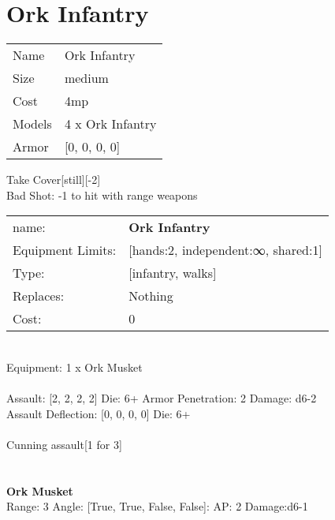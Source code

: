 \pagebreak\pagebreak

\section{ Ork Infantry }

\begin{tabular}{ll}
  Name & Ork Infantry \\
  Size & medium\\
  Cost & 4mp\\
  Models & 4 x Ork Infantry\\
  Armor & [0, 0, 0, 0]\\
\end{tabular}

\noindent Take Cover[still][-2]\\ 
Bad Shot: -1 to hit with range weapons\\ 


\noindent
\begin{tabular}{ll}
name: &{\bf Ork Infantry } \\
Equipment Limits: &[hands:2, independent:∞, shared:1] \\
Type: &[infantry, walks] \\
Replaces: &Nothing \\
Cost: & 0\\
\end{tabular}
\ \\
Equipment: 1 x Ork Musket \\
\ \\
Assault: [2, 2, 2, 2] Die: 6+ Armor Penetration: 2 Damage: d6-2 \\
Assault Deflection: [0, 0, 0, 0] Die: 6+\\
\\ 
Cunning assault[1 for 3]\\ 
 
\ \\

\ \\
{\bf Ork Musket } \\



Range: 3  Angle: [True, True, False, False]: AP: 2 Damage:d6-1 \\




 
\ \\



